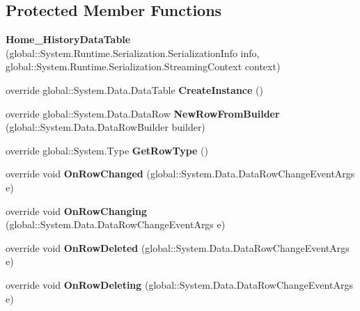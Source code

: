 \subsection*{Protected Member Functions}
\begin{DoxyCompactItemize}
\item 
\mbox{\label{class_a_f_h___scheduler_1_1_home_inspection_data_set_1_1_home___history_data_table_a6d0dc95d00700d8f81bfbd11fd0db04e}} 
{\bfseries Home\+\_\+\+History\+Data\+Table} (global\+::\+System.\+Runtime.\+Serialization.\+Serialization\+Info info, global\+::\+System.\+Runtime.\+Serialization.\+Streaming\+Context context)
\item 
\mbox{\label{class_a_f_h___scheduler_1_1_home_inspection_data_set_1_1_home___history_data_table_a4afa253fb72049b463af3d7fa844525b}} 
override global\+::\+System.\+Data.\+Data\+Table {\bfseries Create\+Instance} ()
\item 
\mbox{\label{class_a_f_h___scheduler_1_1_home_inspection_data_set_1_1_home___history_data_table_a65826e5cf92ea3e4286505ba5928e794}} 
override global\+::\+System.\+Data.\+Data\+Row {\bfseries New\+Row\+From\+Builder} (global\+::\+System.\+Data.\+Data\+Row\+Builder builder)
\item 
\mbox{\label{class_a_f_h___scheduler_1_1_home_inspection_data_set_1_1_home___history_data_table_a278089dddc59bcfd554928b1dd09da9f}} 
override global\+::\+System.\+Type {\bfseries Get\+Row\+Type} ()
\item 
\mbox{\label{class_a_f_h___scheduler_1_1_home_inspection_data_set_1_1_home___history_data_table_a28fdb60d94d047335f2c95de4f2bfc60}} 
override void {\bfseries On\+Row\+Changed} (global\+::\+System.\+Data.\+Data\+Row\+Change\+Event\+Args e)
\item 
\mbox{\label{class_a_f_h___scheduler_1_1_home_inspection_data_set_1_1_home___history_data_table_afcc5d9ebe9b561f99f8d421b735f3a62}} 
override void {\bfseries On\+Row\+Changing} (global\+::\+System.\+Data.\+Data\+Row\+Change\+Event\+Args e)
\item 
\mbox{\label{class_a_f_h___scheduler_1_1_home_inspection_data_set_1_1_home___history_data_table_ae516ec51bb690b3a3ddfabfd8a8d2390}} 
override void {\bfseries On\+Row\+Deleted} (global\+::\+System.\+Data.\+Data\+Row\+Change\+Event\+Args e)
\item 
\mbox{\label{class_a_f_h___scheduler_1_1_home_inspection_data_set_1_1_home___history_data_table_ae77303961992979ae71016cc8a334b8e}} 
override void {\bfseries On\+Row\+Deleting} (global\+::\+System.\+Data.\+Data\+Row\+Change\+Event\+Args e)
\end{DoxyCompactItemize}
